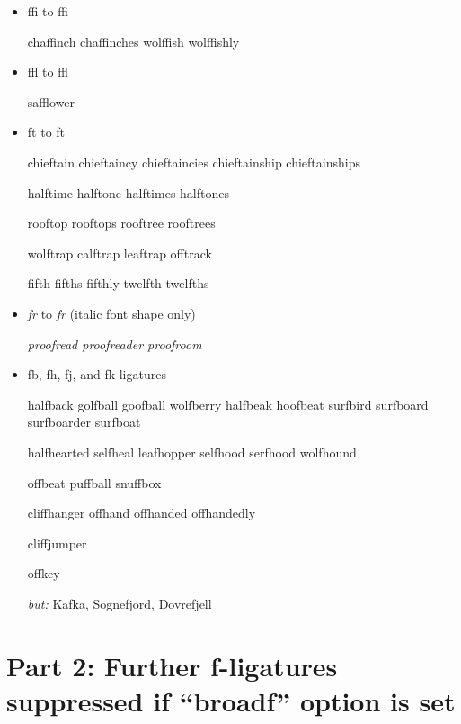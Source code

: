 \begin{itemize}
\item ffi to f\hspace{0pt}fi

chaffinch chaffinches wolffish wolffishly

\item ffl to f\hspace{0pt}fl

safflower



\item ft to f\hspace{0pt}t

chieftain chieftaincy chieftaincies chieftainship chieftainships

halftime halftone halftimes halftones

rooftop rooftops rooftree rooftrees

wolftrap calftrap leaftrap offtrack

fifth fifths fifthly twelfth twelfths



\item \emph{fr} to \emph{f\hspace{0pt}r} (italic font shape only)

\emph{proofread proofreader proofroom}


\item \bgroup \ebg \mbox{fb}, \mbox{fh}, \mbox{fj}, and \mbox{fk} ligatures \egroup

halfback golfball goofball wolfberry halfbeak hoofbeat surfbird surfboard surfboarder surfboat

halfhearted selfheal leafhopper selfhood serfhood wolfhound

offbeat puffball snuffbox

cliffhanger offhand offhanded offhandedly

cliffjumper

offkey

\emph{but:} {\ebg Kafka, Sognefjord, Dovrefjell}




\end{itemize}

\section*{Part 2: Further f-ligatures suppressed if ``broadf'' option is set}

